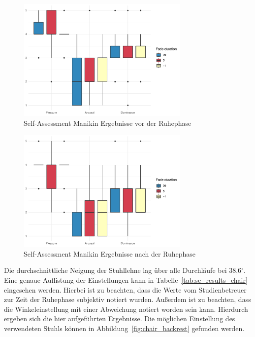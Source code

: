 \begin{figure}
	\centering
	\includegraphics[width=0.75\textwidth]{./appendices/SAMpre}
	\caption{Self-Assessment Manikin Ergebnisse vor der Ruhephase}
	\label{fig:samPre}
\end{figure}%
\begin{figure}
	\centering
	\includegraphics[width=0.75\textwidth]{./appendices/SAMpost}
	\caption{Self-Assessment Manikin Ergebnisse nach der Ruhephase}
	\label{fig:samPost}
\end{figure}

Die durchschnittliche Neigung der Stuhllehne lag über alle Durchläufe bei 38,6$^\circ$. Eine genaue Auflistung der Einstellungen kann in Tabelle~\ref{tab:sc_results_chair} eingesehen werden. Hierbei ist zu beachten, dass die Werte vom Studienbetreuer zur Zeit der Ruhephase subjektiv notiert wurden. Außerdem ist zu beachten, dass die Winkeleinstellung mit einer Abweichung notiert worden sein kann. Hierdurch ergeben sich die hier aufgeführten Ergebnisse. Die möglichen Einstellung des verwendeten Stuhls können in Abbildung~\ref{fig:chair_backrest} gefunden werden.

